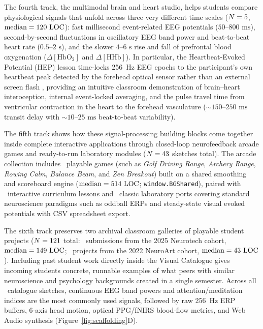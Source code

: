 \documentclass[11pt]{article}
\begin{document}
The fourth track, the multimodal brain and heart studio, helps students compare physiological signals that unfold across three very different time scales \citep{makowski2021neurokit2,cannard2024brainbeats} ($N = 5$, $\text{median} = 120\text{ LOC}$): fast millisecond event-related EEG potentials ($50\text{--}800\text{ ms}$), second-by-second fluctuations in oscillatory EEG band power and beat-to-beat heart rate ($0.5\text{--}2\text{ s}$), and the slower $4\text{--}6\text{ s}$ rise and fall of prefrontal blood oxygenation ($\Delta[\text{HbO}_2]$ and $\Delta[\text{HHb}]$). In particular, the Heartbeat-Evoked Potential (HEP) lesson time-locks 256~Hz EEG epochs to the participant's own heartbeat peak detected by the forehead optical sensor rather than an external screen flash \citep{cannard2024brainbeats,steinfath2025validating}, providing an intuitive classroom demonstration of brain--heart interoception, internal event-locked averaging, and the pulse travel time from ventricular contraction in the heart to the forehead vasculature ($\sim 150\text{--}250\text{ ms}$ transit delay with $\sim 10\text{--}25\text{ ms}$ beat-to-beat variability).

The fifth track shows how these signal-processing building blocks come together inside complete interactive applications through closed-loop neurofeedback arcade games and ready-to-run laboratory modules ($N = 43$ sketches total). The arcade collection includes \NBrainGames\ playable games (such as \emph{Golf Driving Range}, \emph{Archery Range}, \emph{Rowing Calm}, \emph{Balance Beam}, and \emph{Zen Breakout}) built on a shared smoothing and scoreboard engine ($\text{median} = 514\text{ LOC}$; \texttt{window.BGShared}), paired with \NEEGEduModules\ interactive curriculum lessons and \NClassicEEGEdu\ classic laboratory ports covering standard neuroscience paradigms such as oddball ERPs and steady-state visual evoked potentials with CSV spreadsheet export.

The sixth track preserves two archival classroom galleries of playable student projects ($N = 121$ total: \NNeurotechCatalogue\ submissions from the 2025 Neurotech cohort, $\text{median} = 149\text{ LOC}$; \NNeuroArtGallery\ projects from the 2022 NeuroArt cohort, $\text{median} = 43\text{ LOC}$). Including past student work directly inside the Visual Catalogue gives incoming students concrete, runnable examples of what peers with similar neuroscience and psychology backgrounds created in a single semester. Across all \NCatalogueSketches\ catalogue sketches, continuous EEG band powers and attention/meditation indices are the most commonly used signals, followed by raw 256~Hz ERP buffers, 6-axis head motion, optical PPG/fNIRS blood-flow metrics, and Web Audio synthesis (Figure~\ref{fig:scaffolding}D).
\end{document}
